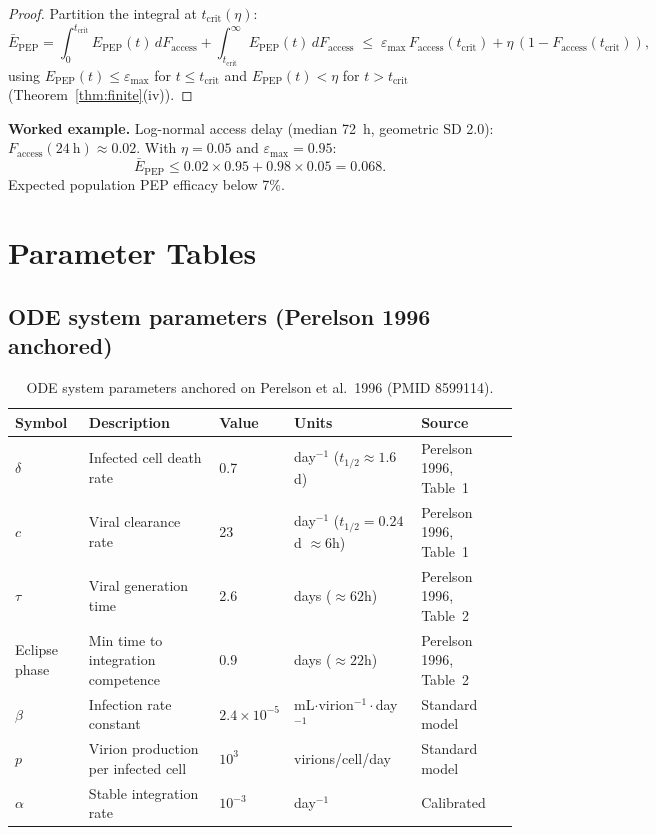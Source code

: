 \documentclass[11pt]{article}
\theoremstyle{definition}
\theoremstyle{remark}
\newcommand{\Epep}{E_{\text{PEP}}}
\newcommand{\Ebarpep}{\bar{E}_{\text{PEP}}}
\newcommand{\Faccess}{F_{\text{access}}}
\newcommand{\tcrit}{t_{\text{crit}}}
\newcommand{\emax}{\varepsilon_{\max}}
\begin{document}
\begin{proof}
Partition the integral at $\tcrit(\eta)$:
\[
\Ebarpep = \int_{0}^{\tcrit} \Epep(t)\,d\Faccess + \int_{\tcrit}^{\infty} \Epep(t)\,d\Faccess
\;\leq\; \emax\,\Faccess(\tcrit) + \eta\,(1 - \Faccess(\tcrit)),
\]
using $\Epep(t) \leq \emax$ for $t \leq \tcrit$ and $\Epep(t) < \eta$ for $t > \tcrit$ (Theorem~\ref{thm:finite}(iv)).
\end{proof}

\textbf{Worked example.} Log-normal access delay (median 72~h, geometric SD 2.0): $\Faccess(24~\text{h}) \approx 0.02$. With $\eta = 0.05$ and $\emax = 0.95$:
\[
\Ebarpep \leq 0.02 \times 0.95 + 0.98 \times 0.05 = 0.068.
\]
Expected population PEP efficacy below 7\%.

\section{Parameter Tables}

\subsection{ODE system parameters (Perelson 1996 anchored)}

\begin{table}[H]
\centering
\small
\caption{ODE system parameters anchored on Perelson et al.\ 1996 (PMID 8599114).}
\begin{tabular}{@{}llllp{4.5cm}@{}}
\toprule
\textbf{Symbol} & \textbf{Description} & \textbf{Value} & \textbf{Units} & \textbf{Source} \\
\midrule
$\delta$ & Infected cell death rate & 0.7 & day$^{-1}$ ($t_{1/2} \approx 1.6$d) & Perelson 1996, Table~1 \\
$c$ & Viral clearance rate & 23 & day$^{-1}$ ($t_{1/2} = 0.24$d $\approx 6$h) & Perelson 1996, Table~1 \\
$\tau$ & Viral generation time & 2.6 & days ($\approx 62$h) & Perelson 1996, Table~2 \\
Eclipse phase & Min time to integration competence & 0.9 & days ($\approx 22$h) & Perelson 1996, Table~2 \\
$\beta$ & Infection rate constant & $2.4 \times 10^{-5}$ & mL$\cdot$virion$^{-1}\cdot$day$^{-1}$ & Standard model \\
$p$ & Virion production per infected cell & $10^{3}$ & virions/cell/day & Standard model \\
$\alpha$ & Stable integration rate & $10^{-3}$ & day$^{-1}$ & Calibrated \\
\bottomrule
\end{tabular}
\end{table}
\end{document}
